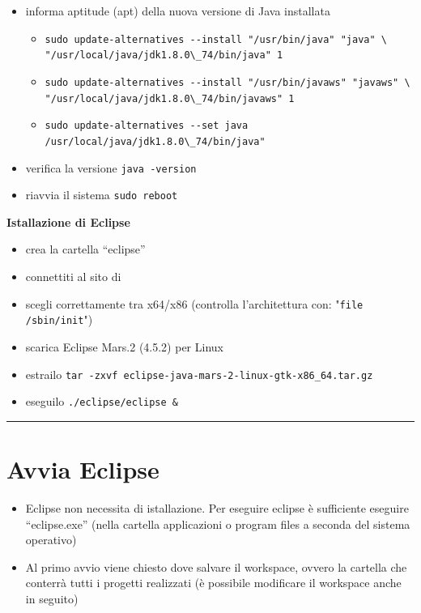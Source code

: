 \documentclass{article}
\begin{document}
\begin{itemize}
\item informa aptitude (apt) della nuova versione di Java installata
\begin{itemize}
\item \verb!sudo update-alternatives --install "/usr/bin/java" "java" \! \\
	  \verb!"/usr/local/java/jdk1.8.0\_74/bin/java" 1!
\item \verb!sudo update-alternatives --install "/usr/bin/javaws" "javaws" \! \\  				      
	  \verb!"/usr/local/java/jdk1.8.0\_74/bin/javaws" 1!
\item \verb!sudo update-alternatives --set java /usr/local/java/jdk1.8.0\_74/bin/java"!
\end{itemize} 
\item verifica la versione \texttt{java -version}
\item riavvia il sistema \texttt{sudo reboot}
\end{itemize}

\textbf{Istallazione di Eclipse}
\begin{itemize}
\item crea la cartella ``eclipse''
\item connettiti al sito di \href{https://eclipse.org/downloads/}{}
\item scegli correttamente tra x64/x86 (controlla l'architettura con:
  "\texttt{file /sbin/init}")
\item scarica Eclipse Mars.2 (4.5.2) per Linux
\item estrailo  \texttt{tar -zxvf eclipse-java-mars-2-linux-gtk-x86\_64.tar.gz}
\item eseguilo \texttt{./eclipse/eclipse \&}
\end{itemize}


\hrule
\section{Avvia Eclipse}
\begin{itemize}
\item Eclipse non necessita di istallazione. Per eseguire eclipse \` e sufficiente eseguire ``eclipse.exe'' (nella cartella applicazioni o program files a seconda del sistema operativo)
\item Al primo avvio viene chiesto dove salvare il workspace, ovvero la cartella  che conterr\` a tutti i progetti realizzati (\`e possibile modificare il workspace anche in seguito)
\end{itemize}
\end{document}
